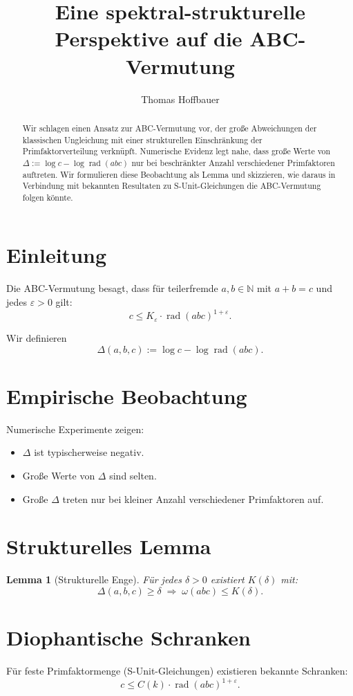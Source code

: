 \documentclass{article}
\title{Eine spektral-strukturelle Perspektive auf die ABC-Vermutung}
\author{Thomas Hoffbauer}
\date{}
\newtheorem{lemma}{Lemma}
\newcommand{\rad}{\operatorname{rad}}
\begin{document}
	\maketitle
	
	\begin{abstract}
		Wir schlagen einen Ansatz zur ABC-Vermutung vor, der große Abweichungen der klassischen Ungleichung mit einer strukturellen Einschränkung der Primfaktorverteilung verknüpft. Numerische Evidenz legt nahe, dass große Werte von $\Delta := \log c - \log \rad(abc)$ nur bei beschränkter Anzahl verschiedener Primfaktoren auftreten. Wir formulieren diese Beobachtung als Lemma und skizzieren, wie daraus in Verbindung mit bekannten Resultaten zu S-Unit-Gleichungen die ABC-Vermutung folgen könnte.
	\end{abstract}
	
	\section{Einleitung}
	Die ABC-Vermutung besagt, dass für teilerfremde $a,b \in \mathbb{N}$ mit $a+b=c$ und jedes $\varepsilon>0$ gilt:
	\[
	c \le K_\varepsilon \cdot \rad(abc)^{1+\varepsilon}.
	\]
	
	Wir definieren
	\[
	\Delta(a,b,c) := \log c - \log \rad(abc).
	\]
	
	\section{Empirische Beobachtung}
	Numerische Experimente zeigen:
	\begin{itemize}
		\item $\Delta$ ist typischerweise negativ.
		\item Große Werte von $\Delta$ sind selten.
		\item Große $\Delta$ treten nur bei kleiner Anzahl verschiedener Primfaktoren auf.
	\end{itemize}
	
	\section{Strukturelles Lemma}
	\begin{lemma}[Strukturelle Enge]
		Für jedes $\delta>0$ existiert $K(\delta)$ mit:
		\[
		\Delta(a,b,c) \ge \delta \;\Longrightarrow\; \omega(abc) \le K(\delta).
		\]
	\end{lemma}
	
	\section{Diophantische Schranken}
	Für feste Primfaktormenge (S-Unit-Gleichungen) existieren bekannte Schranken:
	\[
	c \le C(k) \cdot \rad(abc)^{1+\varepsilon}.
	\]
	
\end{document}
